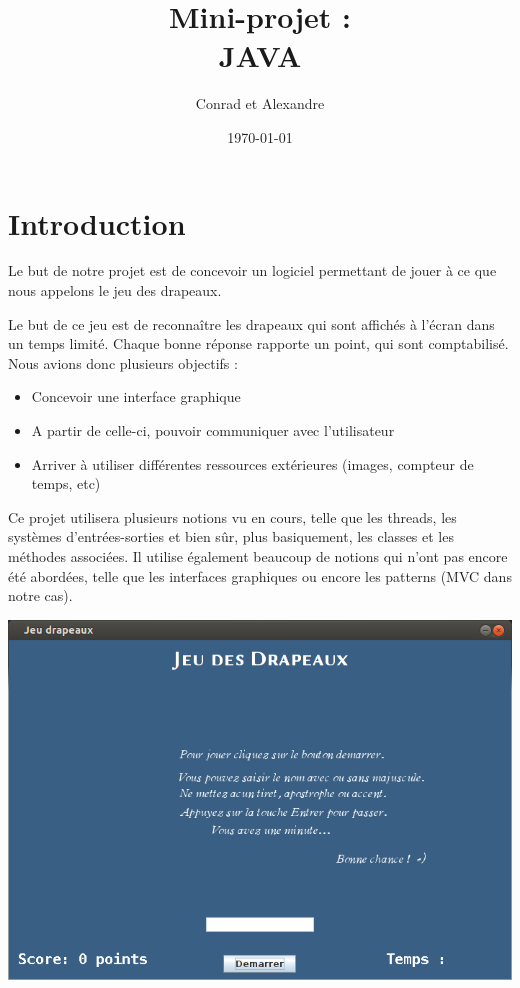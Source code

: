 \documentclass{article}
\author{Conrad \bsc{Hillairet} et Alexandre \bsc{Vieira}}
\title{Mini-projet : \\ \Large{JAVA}}
\date{\today}
\begin{document}
\maketitle

\setcounter{tocdepth}{4}
\tableofcontents
\newpage

\section*{Introduction}
Le but de notre projet est de concevoir un logiciel permettant de jouer à ce que nous appelons le jeu des drapeaux.

\bigskip
Le but de ce jeu est de reconnaître les drapeaux qui sont affichés à l'écran dans un temps limité. Chaque bonne réponse rapporte un point, qui sont comptabilisé. Nous avions donc plusieurs objectifs :
\begin{itemize}
	\item Concevoir une interface graphique
	\item A partir de celle-ci, pouvoir communiquer avec l'utilisateur
	\item Arriver à utiliser différentes ressources extérieures (images, compteur de temps, etc)
\end{itemize}

\bigskip
Ce projet utilisera plusieurs notions vu en cours, telle que les threads, les systèmes d'entrées-sorties et bien sûr, plus basiquement, les classes et les méthodes associées. Il utilise également beaucoup de notions qui n'ont pas encore été abordées, telle que les interfaces graphiques ou encore les patterns (MVC dans notre cas).

\begin{center}\includegraphics[scale=0.5]{intro.png}\end{center}
\end{document}
